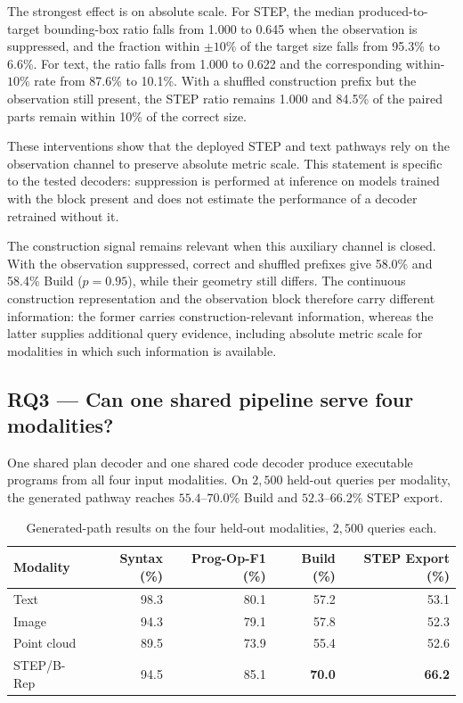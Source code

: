 \documentclass[preprint,12pt]{elsarticle}
\begin{document}
The strongest effect is on absolute scale. For STEP, the median
produced-to-target bounding-box ratio falls from 1.000 to 0.645 when the
observation is suppressed, and the fraction within $\pm10\%$ of the target
size falls from 95.3\% to 6.6\%. For text, the ratio falls from 1.000 to
0.622 and the corresponding within-$10\%$ rate from 87.6\% to 10.1\%.
With a shuffled construction prefix but the observation still present, the
STEP ratio remains 1.000 and 84.5\% of the paired parts remain within 10\% of
the correct size.

These interventions show that the deployed STEP and text pathways rely on the
observation channel to preserve absolute metric scale. This statement is
specific to the tested decoders: suppression is performed at inference on
models trained with the block present and does not estimate the performance of
a decoder retrained without it.

The construction signal remains relevant when this auxiliary channel is
closed. With the observation suppressed, correct and shuffled prefixes give
58.0\% and 58.4\% Build ($p=0.95$), while their geometry still differs. The
continuous construction representation and the observation block therefore
carry different information: the former carries construction-relevant
information, whereas the latter supplies additional query evidence, including
absolute metric scale for modalities in which such information is available.


\subsection{RQ3 --- Can one shared pipeline serve four modalities?}
\label{sec:generation_results}

One shared plan decoder and one shared code decoder produce executable programs
from all four input modalities. On $2{,}500$ held-out queries per modality, the
generated pathway reaches $55.4$--$70.0\%$ Build and $52.3$--$66.2\%$ STEP
export.

\begin{table}[htbp]
  \centering
  \footnotesize
  \caption{Generated-path results on the four held-out modalities,
    $2{,}500$ queries each.}
  \label{tab:generation}
  \begin{tabular}{lrrrr}
    \toprule
    Modality
     & Syntax (\%)
     & Prog-Op-F1 (\%)
     & Build (\%)
     & STEP Export (\%) \\
    \midrule
    Text
     & 98.3
     & 80.1
     & 57.2
     & 53.1             \\
    Image
     & 94.3
     & 79.1
     & 57.8
     & 52.3             \\
    Point cloud
     & 89.5
     & 73.9
     & 55.4
     & 52.6             \\
    STEP/B-Rep
     & 94.5
     & 85.1
     & \textbf{70.0}
     & \textbf{66.2}    \\
    \bottomrule
  \end{tabular}
\end{table}
\end{document}
